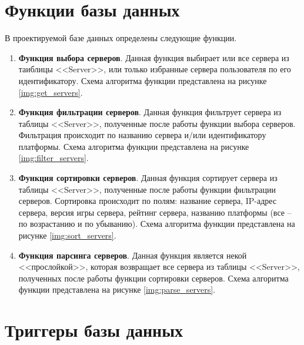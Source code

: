 \section{Функции базы данных} \label{functions}

В проектируемой базе данных определены следующие функции.

\begin{enumerate}
    \item \textbf{Функция выбора серверов}. Данная функция выбирает или все сервера из таиблицы <<Server>>, или только избранные сервера пользователя по его идентификатору. Схема алгоритма функции представлена на рисунке \ref{img:get_servers}.

    \item \textbf{Функция фильтрации серверов}. Данная функция фильтрует сервера из таблицы <<Server>>, полученные после работы функции выбора серверов. Фильтрация происходит по названию сервера и/или идентификатору платформы. Схема алгоритма функции представлена на рисунке \ref{img:filter_servers}.

    \item \textbf{Функция сортировки серверов}. Данная функция сортирует сервера из таблицы <<Server>>, полученные после работы функции фильтрации серверов. Сортировка происходит по полям: название сервера, IP-адрес сервера, версия игры сервера, рейтинг сервера, названию платформы (все -- по возрастанию и по убыванию). Схема алгоритма функции представлена на рисунке \ref{img:sort_servers}.

    \item \textbf{Функция парсинга серверов}. Данная функция является некой <<прослойкой>>, которая возвращает все сервера из таблицы <<Server>>, полученных после работы функции сортировки серверов. Схема алгоритма функции представлена на рисунке \ref{img:parse_servers}.
\end{enumerate}

\clearpage
{}


\section{Триггеры базы данных} \label{triggers} 

